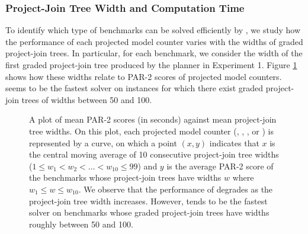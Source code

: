 
\subsubsection{Project-Join Tree Width and Computation Time}

To identify which type of benchmarks can be solved efficiently by \procount{}, we study how the performance of each projected model counter varies with the widths of graded project-join trees.
In particular, for each benchmark, we consider the width of the first graded project-join tree produced by the planner \Lg{} in Experiment 1.
Figure \ref{time_vs_width} shows how these widths relate to PAR-2 scores of projected model counters. 
\procount{} seems to be the fastest solver on instances for which there exist graded project-join trees of widths between 50 and 100.
\begin{figure}[t]
    \centering
    
    \caption{
        A plot of mean PAR-2 scores (in seconds) against mean project-join tree widths.
        On this plot, each projected model counter (\procount{}, \dfp{}, \projmc, or \ssat) is represented by a curve, on which a point $(x, y)$ indicates that $x$ is the central moving average of 10 consecutive project-join tree widths ($1 \le w_1 < w_2 < \ldots < w_{10} \le 99$) and $y$ is the average PAR-2 score of the benchmarks whose project-join trees have widths $w$ where $w_1 \le w \le w_{10}$.
        We observe that the performance of \procount{} degrades as the project-join tree width increases.
        However, \procount{} tends to be the fastest solver on benchmarks whose graded project-join trees have widths roughly between 50 and 100.
    }
    \label{time_vs_width}
\end{figure}
